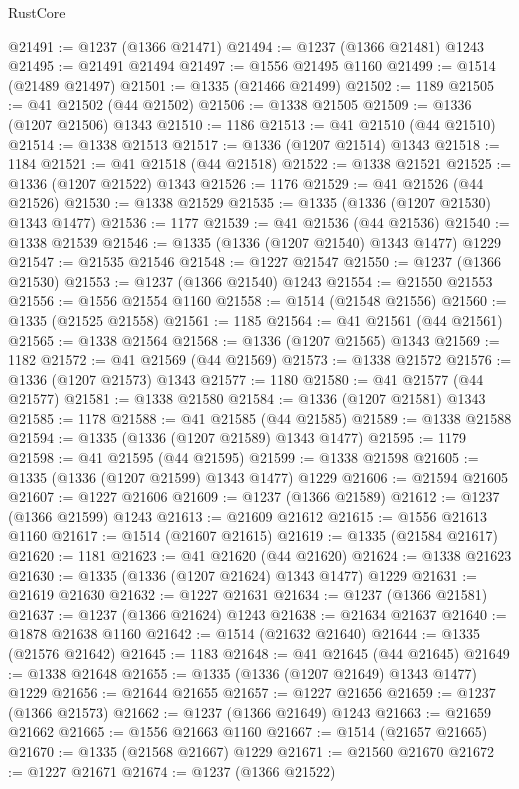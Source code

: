 \begin{lexlean}{RustCore}
\begin{coremodule}
@21491 := @1237 (@1366 @21471)
@21494 := @1237 (@1366 @21481) @1243
@21495 := @21491 @21494
@21497 := @1556 @21495 @1160
@21499 := @1514 (@21489 @21497)
@21501 := @1335 (@21466 @21499)
@21502 := 1189
@21505 := @41 @21502 (@44 @21502)
@21506 := @1338 @21505
@21509 := @1336 (@1207 @21506) @1343
@21510 := 1186
@21513 := @41 @21510 (@44 @21510)
@21514 := @1338 @21513
@21517 := @1336 (@1207 @21514) @1343
@21518 := 1184
@21521 := @41 @21518 (@44 @21518)
@21522 := @1338 @21521
@21525 := @1336 (@1207 @21522) @1343
@21526 := 1176
@21529 := @41 @21526 (@44 @21526)
@21530 := @1338 @21529
@21535 := @1335 (@1336 (@1207 @21530) @1343 @1477)
@21536 := 1177
@21539 := @41 @21536 (@44 @21536)
@21540 := @1338 @21539
@21546 := @1335 (@1336 (@1207 @21540) @1343 @1477) @1229
@21547 := @21535 @21546
@21548 := @1227 @21547
@21550 := @1237 (@1366 @21530)
@21553 := @1237 (@1366 @21540) @1243
@21554 := @21550 @21553
@21556 := @1556 @21554 @1160
@21558 := @1514 (@21548 @21556)
@21560 := @1335 (@21525 @21558)
@21561 := 1185
@21564 := @41 @21561 (@44 @21561)
@21565 := @1338 @21564
@21568 := @1336 (@1207 @21565) @1343
@21569 := 1182
@21572 := @41 @21569 (@44 @21569)
@21573 := @1338 @21572
@21576 := @1336 (@1207 @21573) @1343
@21577 := 1180
@21580 := @41 @21577 (@44 @21577)
@21581 := @1338 @21580
@21584 := @1336 (@1207 @21581) @1343
@21585 := 1178
@21588 := @41 @21585 (@44 @21585)
@21589 := @1338 @21588
@21594 := @1335 (@1336 (@1207 @21589) @1343 @1477)
@21595 := 1179
@21598 := @41 @21595 (@44 @21595)
@21599 := @1338 @21598
@21605 := @1335 (@1336 (@1207 @21599) @1343 @1477) @1229
@21606 := @21594 @21605
@21607 := @1227 @21606
@21609 := @1237 (@1366 @21589)
@21612 := @1237 (@1366 @21599) @1243
@21613 := @21609 @21612
@21615 := @1556 @21613 @1160
@21617 := @1514 (@21607 @21615)
@21619 := @1335 (@21584 @21617)
@21620 := 1181
@21623 := @41 @21620 (@44 @21620)
@21624 := @1338 @21623
@21630 := @1335 (@1336 (@1207 @21624) @1343 @1477) @1229
@21631 := @21619 @21630
@21632 := @1227 @21631
@21634 := @1237 (@1366 @21581)
@21637 := @1237 (@1366 @21624) @1243
@21638 := @21634 @21637
@21640 := @1878 @21638 @1160
@21642 := @1514 (@21632 @21640)
@21644 := @1335 (@21576 @21642)
@21645 := 1183
@21648 := @41 @21645 (@44 @21645)
@21649 := @1338 @21648
@21655 := @1335 (@1336 (@1207 @21649) @1343 @1477) @1229
@21656 := @21644 @21655
@21657 := @1227 @21656
@21659 := @1237 (@1366 @21573)
@21662 := @1237 (@1366 @21649) @1243
@21663 := @21659 @21662
@21665 := @1556 @21663 @1160
@21667 := @1514 (@21657 @21665)
@21670 := @1335 (@21568 @21667) @1229
@21671 := @21560 @21670
@21672 := @1227 @21671
@21674 := @1237 (@1366 @21522)

\end{coremodule}
\end{lexlean}
